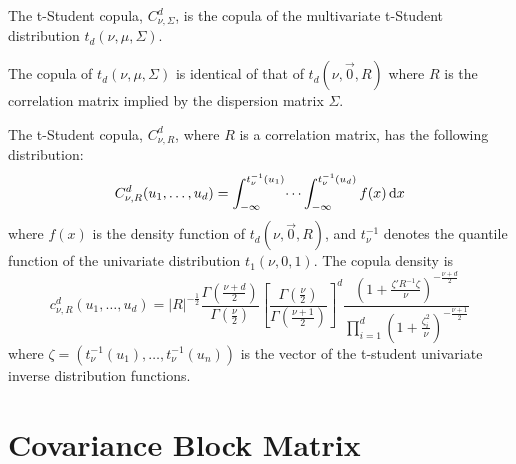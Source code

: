\documentclass[11pt,fleqn]{book} %
\begin{document}
\begin{definition}
	The t-Student copula, $C_{\nu,\Sigma}^d$, is the copula of the multivariate 
	t-Student distribution $t_d(\nu,\mu,\Sigma)$.
\end{definition}

\begin{proposition}
	The copula of $t_d(\nu,\mu,\Sigma)$ is identical of that of $t_d(\nu,\vec{0},R)$
	where $R$ is the correlation matrix implied by the dispersion matrix $\Sigma$.
\end{proposition}

\begin{proposition}
	The t-Student copula, $C_{\nu,R}^d$, where $R$ is a correlation matrix,
	has the following distribution:
	\begin{displaymath}
		C_{\nu,R}^d(u_1, \dots, u_d) = 
		\int_{-\infty}^{t_\nu^{-1}(u_1)} \dots \int_{-\infty}^{t_\nu^{-1}(u_d)} f(x) \mathop{\mathrm{{}d}}\mathopen{} x
	\end{displaymath}
	where $f(x)$ is the density function of $t_d(\nu,\vec{0},R)$, and $t_{\nu}^{-1}$ 
	denotes the quantile function of the univariate distribution $t_1(\nu,0,1)$. 
	The copula density is
	\begin{displaymath}
		\label{eq:density}
		c_{\nu,R}^d(u_1,\dots,u_d) =
		|R|^{-\frac{1}{2}} 
		\displaystyle\frac{\Gamma{\left(\frac{\nu+d}{2}\right)}}{\Gamma{\left(\frac{\nu}{2}\right)}}
		\displaystyle\left[ \frac{\Gamma{\left(\frac{\nu}{2}\right)}}{\Gamma{\left(\frac{\nu+1}{2}\right)}} \right]^d
		\frac{\displaystyle\left( 1+\frac{\zeta' R^{-1} \zeta}{\nu}\right)^{-\frac{\nu+d}{2}}}{\displaystyle\prod_{i=1}^d \left( 1+\frac{\zeta_i^2}{\nu} \right)^{-\frac{\nu+1}{2}}}
	\end{displaymath}
	\noindent
	where $\zeta=(t_\nu^{-1}(u_1), \dots, t_\nu^{-1}(u_n))$ is the vector of 
	the t-student univariate inverse distribution functions.
\end{proposition}

\section{Covariance Block Matrix}
\label{ap:cbm}
\end{document}
